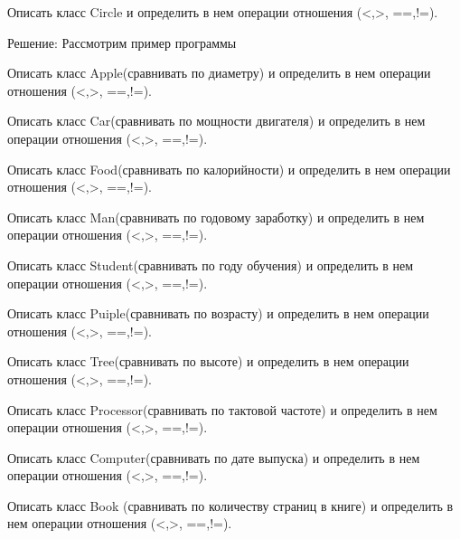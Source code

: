 Описать класс Circle и определить в нем операции отношения (<,>,
==,!=).

Решение: Рассмотрим пример программы


    
    
    

\task Описать класс Apple(сравнивать по диаметру) и определить в нем
операции отношения (<,>, ==,!=).

\task Описать класс Car(сравнивать по мощности двигателя) и определить
в нем операции отношения (<,>, ==,!=).

\task Описать класс Food(сравнивать по калорийности) и определить в
нем операции отношения (<,>, ==,!=).

\task Описать класс Man(сравнивать по годовому заработку) и определить
в нем операции отношения (<,>, ==,!=).

\task Описать класс Student(сравнивать по году обучения) и определить
в нем операции отношения (<,>, ==,!=).

\task Описать класс Puiple(сравнивать по возрасту) и определить в нем
операции отношения (<,>, ==,!=).

\task Описать класс Tree(сравнивать по высоте) и определить в нем
операции отношения (<,>, ==,!=).

\task Описать класс Processor(сравнивать по тактовой частоте) и
определить в нем операции отношения (<,>, ==,!=).

\task Описать класс Computer(сравнивать по дате выпуска) и определить
в нем операции отношения (<,>, ==,!=).

\task Описать класс Book (сравнивать по количеству страниц в книге) и
определить в нем операции отношения (<,>, ==,!=).
